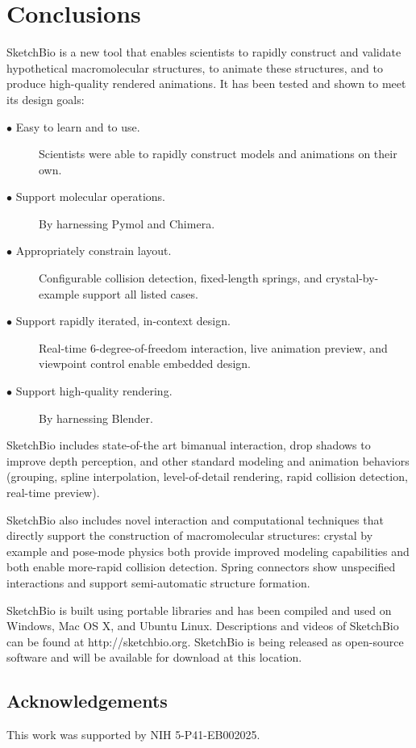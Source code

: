 \documentclass[twocolumn]{bmcart}%
\begin{document}
\section*{Conclusions}
SketchBio is a new tool that enables scientists to rapidly construct and validate hypothetical macromolecular structures, to animate these structures, and to produce high-quality rendered animations.
It has been tested and shown to meet its design goals:
\begin{description}
  \item[$\bullet$ Easy to learn and to use.] Scientists were able to rapidly construct models and animations on their own.
  \item[$\bullet$ Support molecular operations.] By harnessing Pymol and Chimera.
  \item[$\bullet$ Appropriately constrain layout.] Configurable collision detection, fixed-length springs, and crystal-by-example support all listed cases.
  \item[$\bullet$ Support rapidly iterated, in-context design.] Real-time 6-degree-of-freedom interaction, live animation preview, and viewpoint control enable embedded design.
  \item[$\bullet$ Support high-quality rendering.] By harnessing Blender.
\end{description}

SketchBio includes state-of-the art bimanual interaction, drop shadows to improve depth perception, and other standard modeling and animation behaviors (grouping, spline interpolation, level-of-detail rendering, rapid collision detection, real-time preview).

SketchBio also includes novel interaction and computational techniques that directly support the construction of macromolecular structures: crystal by example and pose-mode physics both provide improved modeling capabilities and both enable more-rapid collision detection.
Spring connectors show unspecified interactions and support semi-automatic structure formation.

SketchBio is built using portable libraries and has been compiled and used on Windows, Mac OS X, and Ubuntu Linux.
Descriptions and videos of SketchBio can be found at http://sketchbio.org.
SketchBio is being released as open-source software and will be available for download at this location.

\subsection*{Acknowledgements}
This work was supported by NIH 5-P41-EB002025.
\end{document}
